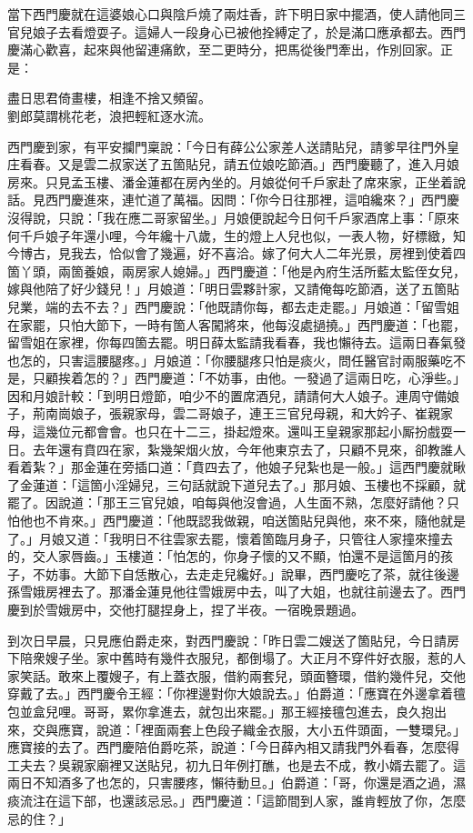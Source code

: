 當下西門慶就在這婆娘心口與陰戶燒了兩炷香，許下明日家中擺酒，使人請他同三官兒娘子去看燈耍子。這婦人一段身心已被他拴縛定了，於是滿口應承都去。西門慶滿心歡喜，起來與他留連痛飲，至二更時分，把馬從後門牽出，作別回家。正是：

\begin{myquote}
盡日思君倚畫樓，相逢不捨又頻留。\\劉郎莫謂桃花老，浪把輕紅逐水流。
\end{myquote}

西門慶到家，有平安攔門稟說：「今日有薛公公家差人送請貼兒，請爹早往門外皇庄看春。又是雲二叔家送了五箇貼兒，請五位娘吃節酒。」西門慶聽了，進入月娘房來。只見孟玉樓、潘金蓮都在房內坐的。月娘從何千戶家赴了席來家，正坐着說話。見西門慶進來，連忙道了萬福。因問：「你今日往那裡，這咱纔來？」西門慶沒得說，只說：「我在應二哥家留坐。」月娘便說起今日何千戶家酒席上事：「原來何千戶娘子年還小哩，今年纔十八歲，生的燈上人兒也似，一表人物，好標緻，知今博古，見我去，恰似會了幾遍，好不喜洽。嫁了何大人二年光景，房裡到使着四箇丫頭，兩箇養娘，兩房家人媳婦。」西門慶道：「他是內府生活所藍太監侄女兒，嫁與他陪了好少錢兒！」月娘道：「明日雲夥計家，又請俺每吃節酒，送了五箇貼兒業，端的去不去？」西門慶說：「他既請你每，都去走走罷。」月娘道：「留雪姐在家罷，只怕大節下，一時有箇人客闖將來，他每沒處撾撓。」西門慶道：「也罷，留雪姐在家裡，你每四箇去罷。明日薛太監請我看春，我也懶待去。這兩日春氣發也怎的，只害這腰腿疼。」月娘道：「你腰腿疼只怕是痰火，問任醫官討兩服藥吃不是，只顧挨着怎的？」西門慶道：「不妨事，由他。一發過了這兩日吃，心淨些。」因和月娘計較：「到明日燈節，咱少不的置席酒兒，請請何大人娘子。連周守備娘子，荊南崗娘子，張親家母，雲二哥娘子，連王三官兒母親，和大妗子、崔親家母，這幾位元都會會。也只在十二三，掛起燈來。還叫王皇親家那起小厮扮戲耍一日。去年還有賁四在家，紮幾架烟火放，今年他東京去了，只顧不見來，卻教誰人看着紮？」那金蓮在旁插口道：「賁四去了，他娘子兒紮也是一般。」{}這西門慶就瞅了金蓮道：「這箇小淫婦兒，三句話就說下道兒去了。」那月娘、玉樓也不採顧，就罷了。因說道：「那王三官兒娘，咱每與他沒會過，人生面不熟，怎麼好請他？只怕他也不肯來。」西門慶道：「他既認我做親，咱送箇貼兒與他，來不來，隨他就是了。」月娘又道：「我明日不往雲家去罷，懷着箇臨月身子，只管往人家撞來撞去的，交人家唇齒。」玉樓道：「怕怎的，你身子懷的又不顯，怕還不是這箇月的孩子，不妨事。大節下自恁散心，去走走兒纔好。」說畢，西門慶吃了茶，就往後邊孫雪娥房裡去了。那潘金蓮見他往雪娥房中去，叫了大姐，也就往前邊去了。西門慶到於雪娥房中，交他打腿捏身上，捏了半夜。{}一宿晚景題過。

到次日早晨，只見應伯爵走來，對西門慶說：「昨日雲二嫂送了箇貼兒，今日請房下陪衆嫂子坐。家中舊時有幾件衣服兒，都倒塌了。大正月不穿件好衣服，惹的人家笑話。敢來上覆嫂子，有上蓋衣服，借約兩套兒，頭面簪環，借約幾件兒，交他穿戴了去。」西門慶令王經：「你裡邊對你大娘說去。」伯爵道：「應寶在外邊拿着氊包並盒兒哩。哥哥，累你拿進去，就包出來罷。」那王經接氊包進去，良久抱出來，交與應寶，說道：「裡面兩套上色段子織金衣服，大小五件頭面，一雙環兒。」{}應寶接的去了。西門慶陪伯爵吃茶，說道：「今日薛內相又請我門外看春，怎麼得工夫去？吳親家廟裡又送貼兒，初九日年例打醮，也是去不成，教小婿去罷了。這兩日不知酒多了也怎的，只害腰疼，懶待動旦。」伯爵道：「哥，你還是酒之過，濕痰流注在這下部，也還該忌忌。」西門慶道：「這節間到人家，誰肯輕放了你，怎麼忌的住？」

